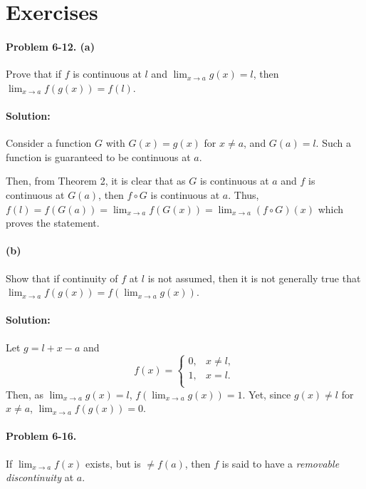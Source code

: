 \documentclass{article}
\begin{document}
\section*{Exercises}

\paragraph{Problem 6-12. (a)} Prove that if $f$ is continuous at $l$ and
$\lim_{x \rightarrow a}g(x) = l$, then $\lim_{x \rightarrow a}f(g(x)) = f(l)$.

\paragraph{Solution:} Consider a function $G$ with $G(x) = g(x)$ for $x
\neq a$, and $G(a) = l$. Such a function is guaranteed to be continuous at $a$.

Then, from Theorem 2, it is clear that as $G$ is continuous at $a$ and $f$ is
continuous at $G(a)$, then $f \circ G$ is continuous at $a$. Thus, $f(l) =
f(G(a)) = \lim_{x \rightarrow a}f(G(x)) = \lim_{x \rightarrow a}(f \circ G)(x)$
which proves the statement.

\paragraph{(b)} Show that if continuity of $f$ at $l$ is not assumed,
then it is not generally true that $\lim_{x \rightarrow a}f(g(x)) = f(\lim_{x
\rightarrow a}g(x))$.

\paragraph{Solution:} Let $g = l + x - a$ and \begin{equation*}
  f(x) = \begin{cases}
    0, &x \neq l, \\
    1, &x = l. \\
  \end{cases}
\end{equation*}
Then, as $\lim_{x \rightarrow a}g(x) = l$, $f(\lim_{x \rightarrow a}g(x)) = 1$.
Yet, since $g(x) \neq l$ for $x \neq a$, $\lim_{x \rightarrow a}f(g(x)) = 0$.

\paragraph{Problem 6-16.} If $\lim_{x \rightarrow a}f(x)$ exists, but is $\neq
f(a)$, then $f$ is said to have a \emph{removable discontinuity} at $a$.
\end{document}

